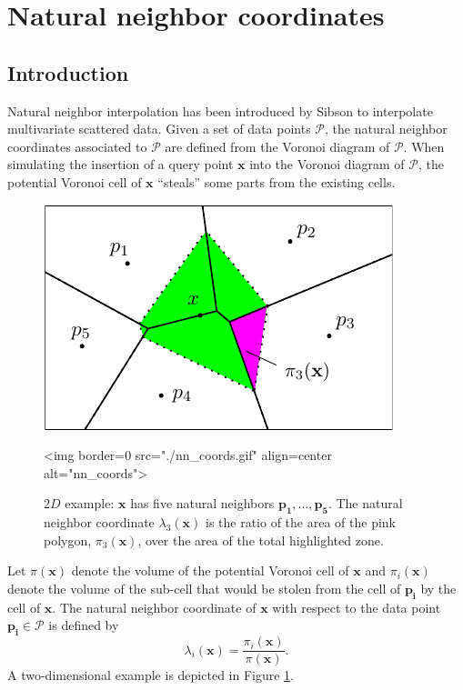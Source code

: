\section{Natural neighbor coordinates}\label{sec:coordinates}
\subsection{Introduction}
Natural neighbor interpolation has been introduced by Sibson
\cite{s-bdnni-81} to interpolate multivariate scattered data.  Given
a set of data points $\mathcal{P}$, the natural neighbor coordinates
associated to $\mathcal{P}$ are defined from the Voronoi diagram of
$\mathcal{P}$.  When simulating the insertion of a query point
$\mathbf{x}$ into the Voronoi diagram of $\mathcal{P}$, the potential
Voronoi cell of $\mathbf{x}$ ``steals'' some parts from the existing
cells. 

\begin{figure}[ht!]
\begin{ccTexOnly}
\begin{center}
  \includegraphics{Interpolation/nn_coords}
\end{center}
\end{ccTexOnly}
\caption{$2D$ example: $\mathbf{x}$ has five natural neighbors 
  $\mathbf{p_1},\ldots , \mathbf{p_5}$. 
  The natural neighbor coordinate $\lambda_3(\mathbf{x})$ is the ratio
  of the area of the pink polygon, $\pi_3(\mathbf{x})$, over the area
  of the total highlighted zone.
  \label{fig:nn_coords}}
\begin{ccHtmlOnly}
<img border=0 src="./nn_coords.gif"  align=center  alt="nn_coords">
\end{ccHtmlOnly}
\end{figure}



Let $\pi(\mathbf{x})$ denote the volume of the potential Voronoi cell
of $\mathbf{x}$ and $\pi_i(\mathbf{x})$ denote the volume of the
sub-cell that would be stolen from the cell of $\mathbf{p_i}$ by the
cell of $\mathbf{x}$.  The natural neighbor coordinate of $\mathbf{x}$
with respect to the data point $\mathbf{p_i}\in \mathcal{P}$ is defined by
$$
\lambda_i(\mathbf{x}) =
\frac{\pi_i(\mathbf{x})}{\pi(\mathbf{x})}.$$
A two-dimensional example
is depicted in Figure \ref{fig:nn_coords}.


